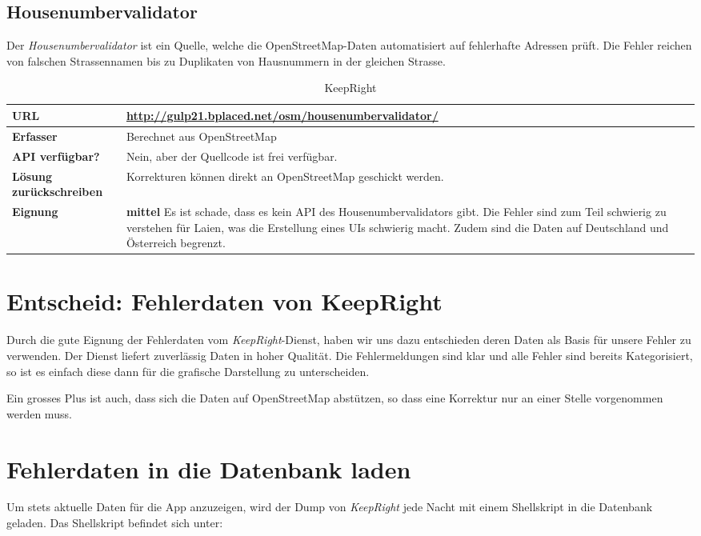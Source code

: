 \subsection{Housenumbervalidator}
Der \emph{Housenumbervalidator} ist ein Quelle, welche die \gls{OpenStreetMap}-Daten automatisiert auf fehlerhafte Adressen prüft.
Die Fehler reichen von falschen Strassennamen bis zu Duplikaten von Hausnummern in der gleichen Strasse.

\begin{table}[H]
\centering
\begin{tabular}{|p{0.3\twocelltabwidth}|p{0.7\twocelltabwidth}|}
\hline 
\small{\textbf{URL}} & \url{http://gulp21.bplaced.net/osm/housenumbervalidator/} \\
\hline 
\small{\textbf{Erfasser}} & Berechnet aus \gls{OpenStreetMap} \\
\hline 
\small{\textbf{API verfügbar?}} & Nein, aber der Quellcode ist frei verfügbar. \\
\hline 
\small{\textbf{Lösung zurückschreiben}} & Korrekturen können direkt an \gls{OpenStreetMap} geschickt werden. \\
\hline
\small{\textbf{Eignung}} & \textbf{mittel} \linebreak Es ist schade, dass es kein API des Housenumbervalidators gibt. Die Fehler sind zum Teil schwierig zu verstehen für Laien, was die Erstellung eines UIs schwierig macht. Zudem sind die Daten auf Deutschland und Österreich begrenzt. \\
\hline
\end{tabular}
\caption{KeepRight}
\label{datenquellen-keepright}
\end{table}

\section{Entscheid: Fehlerdaten von KeepRight}
Durch die gute Eignung der Fehlerdaten vom \emph{KeepRight}-Dienst, haben wir uns dazu entschieden deren Daten als Basis für unsere Fehler zu verwenden.
Der Dienst liefert zuverlässig Daten in hoher Qualität.
Die Fehlermeldungen sind klar und alle Fehler sind bereits Kategorisiert, so ist es einfach diese dann für die grafische Darstellung zu unterscheiden.

Ein grosses Plus ist auch, dass sich die Daten auf \gls{OpenStreetMap} abstützen, so dass eine Korrektur nur an einer Stelle vorgenommen werden muss.

\section{Fehlerdaten in die Datenbank laden}
Um stets aktuelle Daten für die App anzuzeigen, wird der Dump von \emph{KeepRight} jede Nacht mit einem Shellskript in die Datenbank geladen.
Das Shellskript befindet sich unter:

